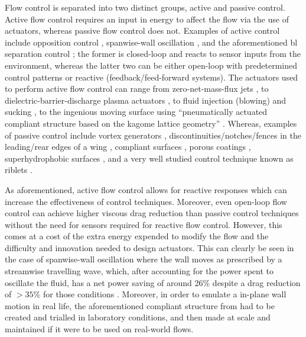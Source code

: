 Flow control is separated into two distinct groups, active and passive control. Active flow control requires an input in energy to affect the flow via the use of actuators, whereas passive flow control does not. Examples of active control include opposition control \cite{choi1994,luhar2014}, spanwise-wall oscillation \cite{jung1992,choi1998,viotti2009}, and the aforementioned \gls*{bl} separation control \cite{prandtl1904}; the former is closed-loop and reacts to sensor inputs from the environment, whereas the latter two can be either open-loop with predetermined control patterns or reactive (feedback/feed-forward systems). The actuators used to perform active flow control can range from zero-net-mass-flux jets \cite{zhang2008}, to dielectric-barrier-discharge plasma actuators \cite{wang2013}, to fluid injection (blowing) and sucking \cite{chng2009}, to the ingenious moving surface using ``pneumatically actuated compliant structure based on the kagome lattice geometry'' \cite{bird2018}.
Whereas, examples of passive control include vortex generators \cite{chang1970}, discontinuities/notches/fences in the leading/rear edges of a wing \cite{chang1970}, compliant surfaces \cite{choi1997}, porous coatings \cite{klausmann2017}, superhydrophobic surfaces \cite{truesdell2006}, and a very well studied control technique known as riblets \cite{walsh1983,choi1993,garcia-mayoral2011}.

As aforementioned, active flow control allows for reactive responses which can increase the effectiveness of control techniques. Moreover, even open-loop flow control can achieve higher viscous drag reduction than passive control techniques without the need for sensors required for reactive flow control. However, this comes at a cost of the extra energy expended to modify the flow and the difficulty and innovation needed to design actuators. This can clearly be seen in the case of spanwise-wall oscillation where the wall moves as prescribed by a streamwise travelling wave, which, after accounting for the power spent to oscillate the fluid, has a net power saving of around 26\% despite a drag reduction of $>35\%$ for those conditions \cite{quadrio2009}. Moreover, in order to emulate a in-plane wall motion in real life, the aforementioned compliant structure from \cite{bird2018} had to be created and trialled in laboratory conditions, and then made at scale and maintained if it were to be used on real-world flows.

